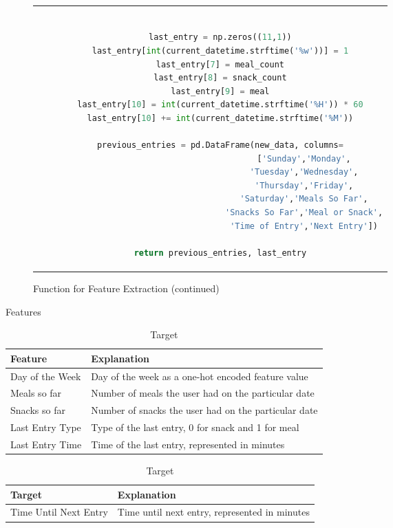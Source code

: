 \begin{figure}
  \ContinuedFloat
  \begin{tabular}{c}
  \begin{lstlisting}[language=python, breaklines, breakatwhitespace]

    last_entry = np.zeros((11,1))
    last_entry[int(current_datetime.strftime('%w'))] = 1
    last_entry[7] = meal_count
    last_entry[8] = snack_count
    last_entry[9] = meal
    last_entry[10] = int(current_datetime.strftime('%H')) * 60
    last_entry[10] += int(current_datetime.strftime('%M'))

    previous_entries = pd.DataFrame(new_data, columns=
                                      ['Sunday','Monday',
                                      'Tuesday','Wednesday',
                                      'Thursday','Friday',
                                      'Saturday','Meals So Far',
                                      'Snacks So Far','Meal or Snack',
                                      'Time of Entry','Next Entry'])

    return previous_entries, last_entry

  \end{lstlisting}
  \end{tabular}
  \caption[]{Function for Feature Extraction (continued)}
\end{figure}

\begin{table}[htbp]
  \caption[Features]{Features}
  \label{tab:features}
  \centering
  \begin{tabular}{l|l}
    Feature&Explanation\\ \toprule
    Day of the Week&Day of the week as a one-hot encoded feature value\\ \hline
    Meals so far&Number of meals the user had on the particular date\\ \hline
    Snacks so far&Number of snacks the user had on the particular date\\ \hline
    Last Entry Type&Type of the last entry, 0 for snack and 1 for meal\\ \hline
    Last Entry Time&Time of the last entry, represented in minutes\\ \hline
  \end{tabular}

  \caption[Target]{Target}
  \label{tab:target}
  \centering
  \begin{tabular}{l|l}
    Target&Explanation\\ \toprule
    Time Until Next Entry&Time until next entry, represented in minutes\\ \hline
  \end{tabular}
\end{table}

